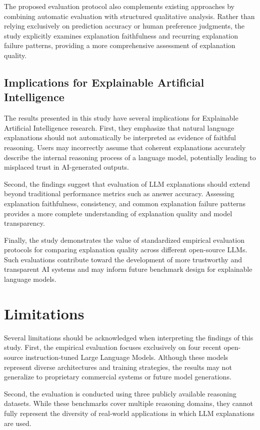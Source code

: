 \documentclass{article}
\begin{document}
The proposed evaluation protocol also complements existing approaches by combining automatic evaluation with structured qualitative analysis. Rather than relying exclusively on prediction accuracy or human preference judgments, the study explicitly examines explanation faithfulness and recurring explanation failure patterns, providing a more comprehensive assessment of explanation quality.

\subsection{Implications for Explainable Artificial Intelligence}

The results presented in this study have several implications for Explainable Artificial Intelligence research. First, they emphasize that natural language explanations should not automatically be interpreted as evidence of faithful reasoning. Users may incorrectly assume that coherent explanations accurately describe the internal reasoning process of a language model, potentially leading to misplaced trust in AI-generated outputs.

Second, the findings suggest that evaluation of LLM explanations should extend beyond traditional performance metrics such as answer accuracy. Assessing explanation faithfulness, consistency, and common explanation failure patterns provides a more complete understanding of explanation quality and model transparency.

Finally, the study demonstrates the value of standardized empirical evaluation protocols for comparing explanation quality across different open-source LLMs. Such evaluations contribute toward the development of more trustworthy and transparent AI systems and may inform future benchmark design for explainable language models.




\section{Limitations}

Several limitations should be acknowledged when interpreting the findings of this study. First, the empirical evaluation focuses exclusively on four recent open-source instruction-tuned Large Language Models. Although these models represent diverse architectures and training strategies, the results may not generalize to proprietary commercial systems or future model generations.

Second, the evaluation is conducted using three publicly available reasoning datasets. While these benchmarks cover multiple reasoning domains, they cannot fully represent the diversity of real-world applications in which LLM explanations are used.
\end{document}
